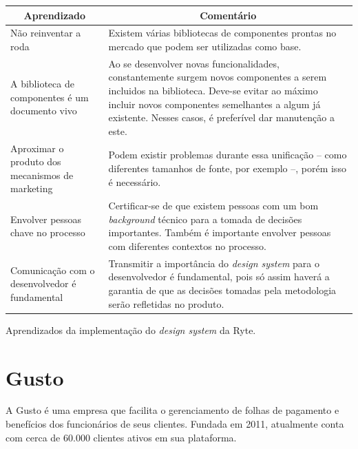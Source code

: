 \begin{quadro}
  \centering
  \begin{tabular}{|m{4cm}|m{10cm}|} \hline
    
    \multicolumn{1}{|c|}{\bfseries Aprendizado} & \multicolumn{1}{c|}{\bfseries Comentário} \\\hline
    
     Não reinventar a roda & Existem várias bibliotecas de componentes prontas no mercado que podem ser utilizadas como base. \\\hline
     
     A biblioteca de componentes é um documento vivo & Ao se desenvolver novas funcionalidades, constantemente surgem novos componentes a serem incluidos na biblioteca. Deve-se evitar ao máximo incluir novos componentes semelhantes a algum já existente. Nesses casos, é preferível dar manutenção a este. \\\hline
     
     Aproximar o produto dos mecanismos de marketing & Podem existir problemas durante essa unificação -- como diferentes tamanhos de fonte, por exemplo --, porém isso é necessário. \\\hline
     
     Envolver pessoas chave no processo & Certificar-se de que existem pessoas com um bom \textit{background} técnico para a tomada de decisões importantes. Também é importante envolver pessoas com diferentes contextos no processo. \\\hline
     
     Comunicação com o desenvolvedor é fundamental & Transmitir a importância do \textit{design system} para o desenvolvedor é fundamental, pois só assim haverá a garantia de que as decisões tomadas pela metodologia serão refletidas no produto. \\\hline
      
  \end{tabular}
  \caption{Aprendizados da implementação do \textit{design system} da Ryte.}
  \label{table:ryteLessonsLearned}
\end{quadro}

\section{Gusto}
\label{sec:gusto}

A Gusto é uma empresa que facilita o gerenciamento de folhas de pagamento e benefícios dos funcionários de seus clientes. Fundada em 2011, atualmente conta com cerca de 60.000 clientes ativos em sua plataforma.

